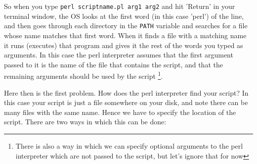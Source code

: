 \documentclass[11pt]{article}
\begin{document}
So when you type \texttt{perl scriptname.pl arg1 arg2} and hit 'Return' in your terminal window,
the OS looks at the first word (in this case 'perl') of the line, and then goes through each directory in the \texttt{PATH}
variable and searches for a file whose name matches that first word. When it finds a file with
a matching name it runs (executes) that program and gives it the rest of the words you typed
as arguments. In this case the perl interpreter assumes that the first argument passed to it
is the name of the file that contains the script, and that the remaining arguments should be used
by the script \footnote{There is also a way in which we can specify optional arguments to the perl
interpreter which are not passed to the script, but let's ignore that for now}.

Here then is the first problem. How does the perl interpreter find your script? In this case your
script is just a file somewhere on your disk, and note there can be many files with the same name.
Hence we have to specify the location of the script. There are two ways in which this can be done:
\end{document}
